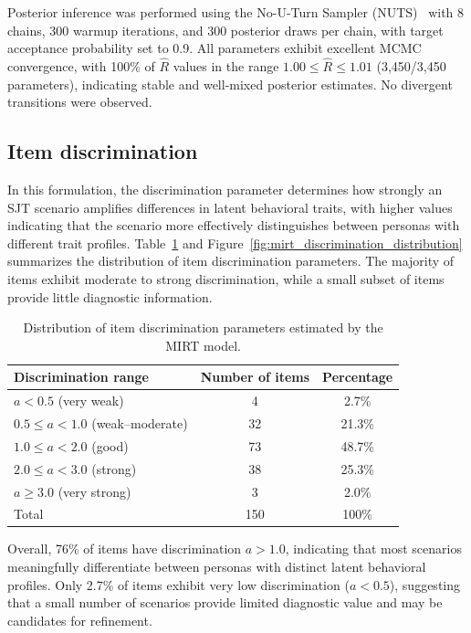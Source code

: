 Posterior inference was performed using the No-U-Turn Sampler (NUTS)~\citep{hoffman2014no} with 8 chains, 300 warmup iterations, and 300 posterior draws per chain, with target acceptance probability set to 0.9. All parameters exhibit excellent MCMC convergence, with 100\% of $\hat{R}$ values in the range $1.00 \le \hat{R} \le 1.01$ (3{,}450/3{,}450 parameters), indicating stable and well-mixed posterior estimates. No divergent transitions were observed.

\subsection{Item discrimination}
\label{app:mirt_1}
In this formulation, the discrimination parameter determines how strongly an SJT scenario amplifies differences in latent behavioral traits, with higher values indicating that the scenario more effectively distinguishes between personas with different trait profiles.
Table~\ref{tab:item_discrimination} and Figure~\ref{fig:mirt_discrimination_distribution} summarizes the distribution of item discrimination parameters. The majority of items exhibit moderate to strong discrimination, while a small subset of items provide little diagnostic information.

\begin{table}[h]
\centering
\begin{tabular}{lcc}
\hline
Discrimination range & Number of items & Percentage \\
\hline
$a < 0.5$ (very weak) & 4 & 2.7\% \\
$0.5 \le a < 1.0$ (weak--moderate) & 32 & 21.3\% \\
$1.0 \le a < 2.0$ (good) & 73 & 48.7\% \\
$2.0 \le a < 3.0$ (strong) & 38 & 25.3\% \\
$a \ge 3.0$ (very strong) & 3 & 2.0\% \\
\hline
Total & 150 & 100\% \\
\hline
\end{tabular}
\caption{Distribution of item discrimination parameters estimated by the MIRT model.}
\label{tab:item_discrimination}
\end{table}

Overall, 76\% of items have discrimination $a > 1.0$, indicating that most scenarios meaningfully differentiate between personas with distinct latent behavioral profiles. Only 2.7\% of items exhibit very low discrimination ($a < 0.5$), suggesting that a small number of scenarios provide limited diagnostic value and may be candidates for refinement.

